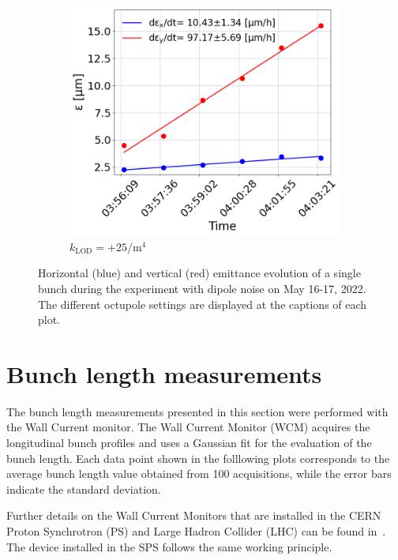 \begin{figure}[htp]
\begin{subfigure}{.45\textwidth}
        \centering
        \includegraphics[width=.95\linewidth]{images/app_c/emit_vs_time_Set1_coast7.png}  
        \caption{$k_\mathrm{LOD}=+25  \mathrm{/m^{4}}$}
\end{subfigure}
    \caption{Horizontal (blue) and vertical (red) emittance evolution of a single bunch during the experiment with dipole noise on May 16-17, 2022.  The different octupole settings are displayed at the captions of each plot.}
    \label{fig:dipole_noise_md_2022_overview_plots_klod_scan}
 \end{figure}
 
 

 \section{Bunch length measurements}\label{sec:bunch_length_meas_2022}


 The bunch length measurements presented in this section were performed with the Wall Current monitor. The Wall Current Monitor (WCM) acquires the longitudinal bunch profiles and uses a Gaussian fit for the evaluation of the bunch length. Each data point shown in the folllowing plots corresponds to the average bunch length value obtained from 100 acquisitions, while the error bars indicate the standard deviation.

 Further details on the Wall Current Monitors that are installed in the CERN Proton Synchrotron (PS) and Large Hadron Collider (LHC) can be found in~\cite{Belleman:2313362, Argyropoulos:2752314}. The device installed in the SPS follows the same working principle. 


